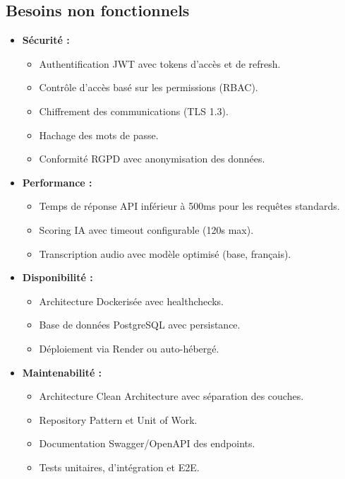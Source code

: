 \subsection{Besoins non fonctionnels}

\begin{itemize}[label=\textbullet, itemsep=5pt]

    \item \textbf{Sécurité :}
    \begin{itemize}[itemsep=2pt]
        \item Authentification JWT avec tokens d'accès et de refresh.
        \item Contrôle d'accès basé sur les permissions (RBAC).
        \item Chiffrement des communications (TLS 1.3).
        \item Hachage des mots de passe.
        \item Conformité RGPD avec anonymisation des données.
    \end{itemize}

    \item \textbf{Performance :}
    \begin{itemize}[itemsep=2pt]
        \item Temps de réponse API inférieur à 500ms pour les requêtes standards.
        \item Scoring IA avec timeout configurable (120s max).
        \item Transcription audio avec modèle optimisé (base, français).
    \end{itemize}

    \item \textbf{Disponibilité :}
    \begin{itemize}[itemsep=2pt]
        \item Architecture Dockerisée avec healthchecks.
        \item Base de données PostgreSQL avec persistance.
        \item Déploiement via Render ou auto-hébergé.
    \end{itemize}

    \item \textbf{Maintenabilité :}
    \begin{itemize}[itemsep=2pt]
        \item Architecture Clean Architecture avec séparation des couches.
        \item Repository Pattern et Unit of Work.
        \item Documentation Swagger/OpenAPI des endpoints.
        \item Tests unitaires, d'intégration et E2E.
    \end{itemize}


\end{itemize}
